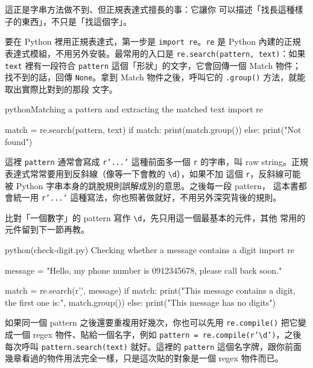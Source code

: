 這正是字串方法做不到、但正規表達式擅長的事：它讓你
可以描述「找長這種樣子的東西」，不只是「找這個字」。

要在 Python 裡用正規表達式，第一步是 \texttt{import re}。\texttt{re} 是 Python 內建的正規
表達式模組，不用另外安裝。最常用的入口是 \texttt{re.search(pattern, text)}：如果 \texttt{text}
裡有一段符合 \texttt{pattern} 這個「形狀」的文字，它會回傳一個 Match 物件；找不到的話，回傳
\texttt{None}。拿到 Match 物件之後，呼叫它的 \texttt{.group()} 方法，就能取出實際比對到的那段
文字。

\begin{code}{python}{Matching a pattern and extracting the matched text}
import re

match = re.search(pattern, text)
if match:
    print(match.group())
else:
    print("Not found")
\end{code}

這裡 \texttt{pattern} 通常會寫成 \texttt{r'...'} 這種前面多一個 \texttt{r} 的字串，叫 raw
string。正規表達式常常要用到反斜線（像等一下會教的 \texttt{\textbackslash d}），如果不加
這個 \texttt{r}，反斜線可能被 Python 字串本身的跳脫規則誤解成別的意思。之後每一段 pattern，
這本書都會統一用 \texttt{r'...'} 這種寫法，你也照著做就好，不用另外深究背後的規則。

比對「一個數字」的 pattern 寫作 \texttt{\textbackslash d}，先只用這一個最基本的元件，其他
常用的元件留到下一節再教。

\begin{example}{python}{(check-digit.py) Checking whether a message contains a digit}
import re

message = "Hello, my phone number is 0912345678, please call back soon."

match = re.search(r'\d', message)
if match:
    print("This message contains a digit, the first one is:", match.group())
else:
    print("This message has no digits")
\end{example}


如果同一個 pattern 之後還要重複用好幾次，你也可以先用 \texttt{re.compile()} 把它變成一個
regex 物件、貼給一個名字，例如 \texttt{pattern = re.compile(r'\textbackslash d')}，之後
每次呼叫 \texttt{pattern.search(text)} 就好。這裡的 \texttt{pattern} 這個名字牌，跟你前面
幾章看過的物件用法完全一樣，只是這次貼的對象是一個 regex 物件而已。

